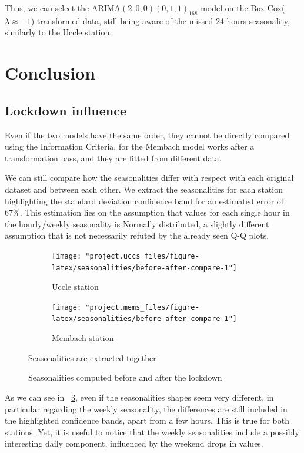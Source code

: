 \documentclass[12pt]{article}
\begin{document}
Thus, we can select the $\mathrm{ARIMA}(2,0,0)(0,1,1)_{168}$ model on the Box-Cox($\lambda\approx-1$) transformed data, still being aware of the missed 24 hours seasonality, similarly to the Uccle station.


\section{Conclusion}
\subsection{Lockdown influence}
Even if the two models have the same order, they cannot be directly compared using the Information Criteria, for the Membach model works after a transformation pass, and they are fitted from different data.

We can still compare how the seasonalities differ with respect with each original dataset and between each other. We extract the seasonalities for each station highlighting the standard deviation confidence band for an estimated error of 67\%. This estimation lies on the assumption that values for each single hour in the hourly/weekly seasonality is Normally distributed, a slightly different assumption that is not necessarily refuted by the already seen Q-Q plots.

\begin{figure}[h]
	\begin{subfigure}{.5\linewidth}
		\texttt{[image: "project.uccs\_files/figure-latex/seasonalities/before-after-compare-1"]}
		\caption{Uccle station}
		\label{fig:season.lockdown:uccs}
	\end{subfigure}
	\begin{subfigure}{.5\linewidth}
		\texttt{[image: "project.mems\_files/figure-latex/seasonalities/before-after-compare-1"]}
		\caption{Membach station}
		\label{fig:season.lockdown:mems}
	\end{subfigure}
	\begin{center}
		\caption{Seasonalities computed before and after the lockdown}{\small Seasonalities are extracted together}
		\label{fig:season.lockdown}
	\end{center}
\end{figure}


As we can see in \figurename~\ref{fig:season.lockdown}, even if the seasonalities shapes seem very different, in particular regarding the weekly seasonality, the differences are still included in the highlighted confidence bands, apart from a few hours. This is true for both stations.
Yet, it is useful to notice that the weekly seasonalities include a possibly interesting daily component, influenced by the weekend drops in values.
\end{document}
